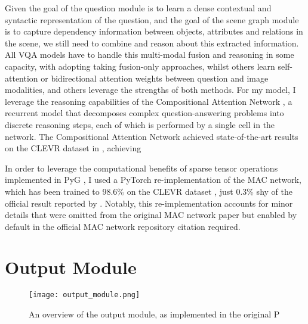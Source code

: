 Given the goal of the question module is to learn a dense contextual and syntactic representation of the question, and the goal of the scene graph module is to capture dependency information between objects, attributes and relations in the scene, we still need to combine and reason about this extracted information. All VQA models have to handle this multi-modal fusion and reasoning in some capacity, with adopting taking fusion-only approaches, whilst others learn self-attention or bidirectional attention weights between question and image modalities, and others leverage the strengths of both methods. For my model, I leverage the reasoning capabilities of the Compositional Attention Network \citeauthor{hudson2018compositional}, a recurrent model that decomposes complex question-answering problems into discrete reasoning steps, each of which is performed by a single cell in the network. The Compositional Attention Network achieved state-of-the-art results on the CLEVR dataset in \citeyear{hudson2018compositional}, achieving 

In order to leverage the computational benefits of sparse tensor operations implemented in PyG \cite{fey2019fast}, I used a PyTorch \cite{paszke2019pytorch} re-implementation of the MAC network, which has been trained to 98.6\% on the CLEVR dataset \cite{eyzaguirre2020differentiable}, just 0.3\% shy of the official result reported by 
\citeauthor{hudson2018compositional}. Notably, this re-implementation accounts for minor details that were omitted from the original MAC network paper but enabled by default in the official MAC network repository {\color{red} citation required}.



\section{Output Module}
\label{section:output_module}

\begin{figure}[htbp]
    \centering
    \texttt{[image: output\_module.png]}
    \caption{An overview of the output module, as implemented in the original P}
    \label{fig:output_module}
\end{figure}

